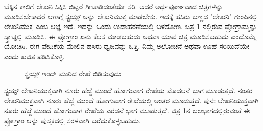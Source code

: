 ಬೆಕ್ಕಿನ ಕಾಲಿಗೆ ಲೇಖನಿ ಸಿಕ್ಕಿಸಿ ಬಿಟ್ಟರೆ ಗೀಚಾಡಿದಂತೆಯೇ ಸರಿ. ಆದರೆ ಅರ್ಥಪೂರ್ಣವಾದ ಚಿತ್ರಗಳನ್ನು ಮೂಡಿಸಬೇಕಾದರೆ ಆಗಾಗ್ಗೆ ಸ್ಪ್ರಯ್ಟ್ ಅನ್ನು ಲೇಖನಿಮುಕ್ತ ಮಾಡಬೇಕು.  ಇದಕ್ಕೆ ಹಸಿರು ಬಣ್ಣದ "ಲೇಖನಿ" ಗುಂಪಿನಲ್ಲಿ ಲೇಖನಿಮುಕ್ತ ಎಂಬ ಆಜ್ಞೆ ಇದೆ.  ಇದನ್ನು ಒಂದು ಉದಾಹರಣೆಯಲ್ಲಿ ಬಳಸೋಣ.  ಚಿತ್ರ \ref{pen_broken_line} ನಲ್ಲಿರುವ ಪ್ರೋಗ್ರಾಮ್ಮನ್ನು ಸ್ಕ್ರಾಚ್ನಲ್ಲಿ ಮೂಡಿಸಿ. ಈ ಪ್ರೋಗ್ರಾಂ ಏನು ಕೆಲಸ ಮಾಡಬಹುದು ಅಥವಾ ಯಾವ ಚಿತ್ರ ಮೂಡಿಸಬಹುದು ಎಂದೊಮ್ಮೆ ಯೋಚಿಸಿ.  ಈಗ ವೇದಿಕೆಯ ಮೇಲಿನ ಹಸಿರು ಧ್ವಜವನ್ನು ಒತ್ತಿ, ನಿಮ್ಮ ಅಲೋಚನೆ ಅಥವಾ ಊಹೆ ಸರಿಯಿದೆಯೇ ಎಂದು ಖಚಿತ ಪಡಿಸಿಕೊಳ್ಳಿ. 

\begin{figure}[h]
\begin{center}
\begin{multicols}{2}
\begin{Scratch}[1]
\beginbox{}
\end{Scratch}


\end{multicols}

\end{center}
\caption{ಸ್ಪ್ರಯ್ಟ್ ಇಂದ್ ಮುರಿದ ರೇಖೆ ಬಿಡಿಸುವುದು}
\label{pen_broken_line}
\end{figure}

ಸ್ಪ್ರಯ್ಟ್ ಲೇಖನಿಯುಕ್ತವಾಗಿ ನೂರು ಹೆಜ್ಜೆ ಮುಂದೆ ಹೋಗುವಾಗ ರೇಖೆಯ ಮೊದಲನೆ ಭಾಗ ಮೂಡುತ್ತದೆ.  ನಂತರ ಲೇಖನಿಮುಕ್ತವಾಗಿ ನೂರು ಹೆಜ್ಜೆ ಮುಂದೆ ಹೋಗುವಾಗ ರೇಖೆಯಲ್ಲಿ ಅಂತರ  ಮೂಡುತ್ತದೆ.  ಪುನಃ ಲೇಖನಿಯುಕ್ತವಾಗಿ ನೂರು ಹೆಜ್ಜೆ ಮುಂದೆ ಹೋಗುವಾಗ ರೇಖೆಯ ಎರಡನೆ  ಭಾಗ ಮೂಡುತ್ತದೆ.  ಚಿತ್ರ \ref{pen_broken_line}ನ ಬಲಭಾಗದಲ್ಲಿರುವಂತೆ  ಈ ಪ್ರೋಗ್ರಾಂ ಆನ್ನು ಪುಸ್ತಕದಲ್ಲಿ  ಸರಳವಾಗಿ ಬರೆದುಕೊಳ್ಳಬಹುದು.  

